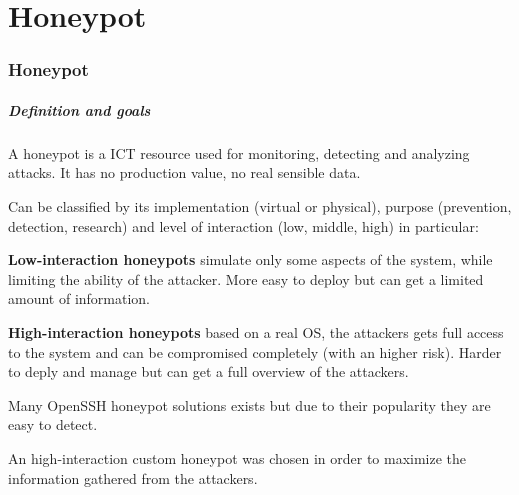 \part{Honeypot}
\section{Honeypot}

\begin{frame}
	\partpage
\end{frame}

\begin{frame}
	\frametitle{Definition and goals}
	
	A honeypot is a ICT resource used for monitoring, detecting and analyzing attacks. It has no production value, no real sensible data. 
	
	\smallskip

	Can be classified by its implementation (virtual or physical), purpose (prevention, detection, research) and level of interaction (low, middle, high) in particular:
	
	\medskip

	\textbf{Low-interaction honeypots} simulate only some aspects of the system, while limiting the ability of the attacker. More easy to deploy but can get a limited amount of information.
	
	\medskip
	
	\textbf{High-interaction honeypots} based on a real OS, the attackers gets full access to the system and can be compromised completely (with an higher risk). Harder to deply and manage but can get a full overview of the attackers.
	
	\medskip

  Many OpenSSH honeypot solutions exists but due to their popularity they are easy to detect.
  
	\smallskip

  An high-interaction custom honeypot was chosen in order to maximize the information gathered from the attackers.
  	
\end{frame}


